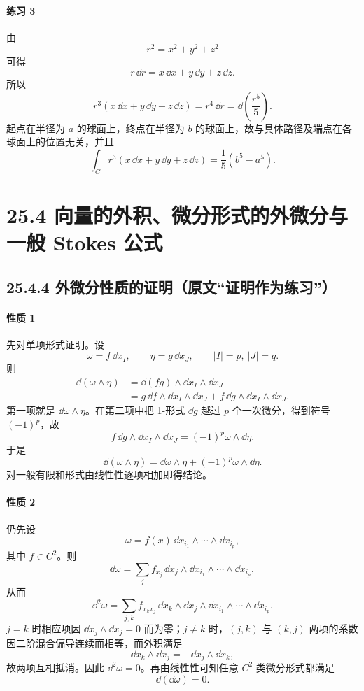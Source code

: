 \paragraph{练习 3}
\begin{xsolution}
由
\[
  r^2=x^2+y^2+z^2
\]
可得
\[
  r\,\dd r=x\,\dd x+y\,\dd y+z\,\dd z.
\]
所以
\[
  r^3(x\,\dd x+y\,\dd y+z\,\dd z)
  =r^4\,\dd r
  =\dd\left(\frac{r^5}{5}\right).
\]
起点在半径为 $a$ 的球面上，终点在半径为 $b$ 的球面上，故与具体路径及端点在各球面上的位置无关，并且
\[
  \boxed{\int_Cr^3(x\,\dd x+y\,\dd y+z\,\dd z)=\frac15(b^5-a^5)}.
\]
\end{xsolution}

\section*{25.4 向量的外积、微分形式的外微分与一般 Stokes 公式}

\subsection*{25.4.4 外微分性质的证明（原文“证明作为练习”）}

\paragraph{性质 1}
\begin{xsolution}
先对单项形式证明。设
\[
  \omega=f\,\dd x_I,
  \qquad \eta=g\,\dd x_J,
  \qquad |I|=p,\ |J|=q.
\]
则
\begin{align*}
\dd(\omega\wedge\eta)
&=\dd(fg)\wedge\dd x_I\wedge\dd x_J\\
&=g\,\dd f\wedge\dd x_I\wedge\dd x_J
 +f\,\dd g\wedge\dd x_I\wedge\dd x_J.
\end{align*}
第一项就是 $\dd\omega\wedge\eta$。在第二项中把 1-形式 $\dd g$ 越过 $p$ 个一次微分，得到符号 $(-1)^p$，故
\[
  f\,\dd g\wedge\dd x_I\wedge\dd x_J
  =(-1)^p\omega\wedge\dd\eta.
\]
于是
\[
  \dd(\omega\wedge\eta)
  =\dd\omega\wedge\eta+(-1)^p\omega\wedge\dd\eta.
\]
对一般有限和形式由线性性逐项相加即得结论。
\end{xsolution}

\paragraph{性质 2}
\begin{xsolution}
仍先设
\[
  \omega=f(x)\,\dd x_{i_1}\wedge\cdots\wedge\dd x_{i_p},
\]
其中 $f\in C^2$。则
\[
  \dd\omega=\sum_j f_{x_j}\,\dd x_j\wedge\dd x_{i_1}\wedge\cdots\wedge\dd x_{i_p},
\]
从而
\[
  \dd^2\omega
  =\sum_{j,k}f_{x_kx_j}\,\dd x_k\wedge\dd x_j
  \wedge\dd x_{i_1}\wedge\cdots\wedge\dd x_{i_p}.
\]
$j=k$ 时相应项因 $\dd x_j\wedge\dd x_j=0$ 而为零；$j\ne k$ 时，$(j,k)$ 与 $(k,j)$ 两项的系数因二阶混合偏导连续而相等，而外积满足
\[
  \dd x_k\wedge\dd x_j=-\dd x_j\wedge\dd x_k,
\]
故两项互相抵消。因此 $\dd^2\omega=0$。再由线性性可知任意 $C^2$ 类微分形式都满足
\[
  \boxed{\dd(\dd\omega)=0}.
\]
\end{xsolution}

